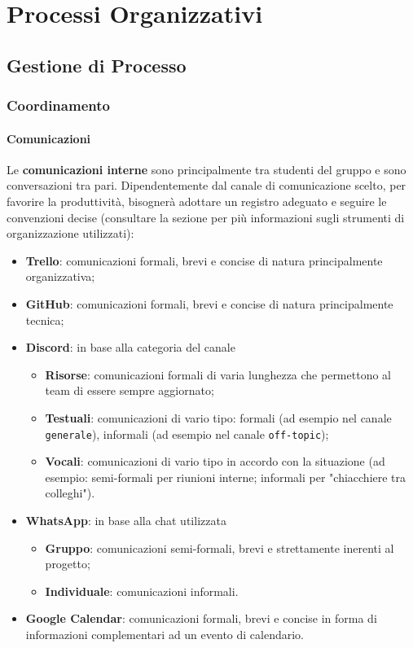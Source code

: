 \chapter{Processi Organizzativi}

\section{Gestione di Processo}

\subsection{Coordinamento}

\subsubsection{Comunicazioni}
Le \textbf{comunicazioni interne} sono principalmente tra studenti del gruppo e sono conversazioni tra pari. Dipendentemente dal canale di comunicazione scelto, per favorire la produttività, bisognerà adottare un registro adeguato e seguire le convenzioni decise (consultare la sezione  per più informazioni sugli strumenti di organizzazione utilizzati):
\begin{itemize}
  \item \textbf{Trello}: comunicazioni formali, brevi e concise di natura principalmente organizzativa;
  \item \textbf{GitHub}: comunicazioni formali, brevi e concise di natura principalmente tecnica;
  \item \textbf{Discord}: in base alla categoria del canale
  \begin{itemize}
    \item \textbf{Risorse}: comunicazioni formali di varia lunghezza che permettono al team di essere sempre aggiornato;
    \item \textbf{Testuali}: comunicazioni di vario tipo: formali (ad esempio nel canale \texttt{generale}), informali (ad esempio nel canale \texttt{off-topic});
    \item \textbf{Vocali}: comunicazioni di vario tipo in accordo con la situazione (ad esempio: semi-formali per riunioni interne; informali per "chiacchiere tra colleghi").
  \end{itemize}
  \item \textbf{WhatsApp}: in base alla chat utilizzata
  \begin{itemize}
    \item \textbf{Gruppo}: comunicazioni semi-formali, brevi e strettamente inerenti al progetto;
    \item \textbf{Individuale}: comunicazioni informali.
  \end{itemize}
  \item \textbf{Google Calendar}: comunicazioni formali, brevi e concise in forma di informazioni complementari ad un evento di calendario.
\end{itemize} 

